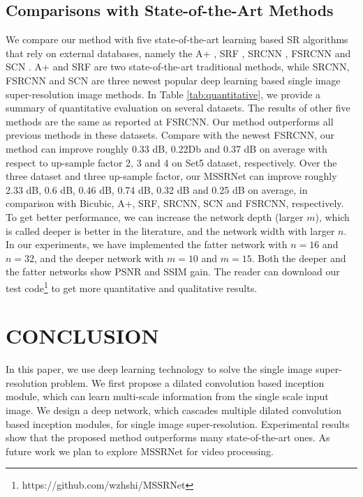 \documentclass{article}
\begin{document}
\subsection{Comparisons with State-of-the-Art Methods}
\label{subsec:comparisons}

We compare our method with five state-of-the-art learning based SR algorithms that rely on external databases, namely the A+ \cite{ref22}, SRF \cite{ref23}, SRCNN \cite{ref4,ref5}, FSRCNN \cite{ref7} and SCN \cite{ref24}. A+ and SRF are two state-of-the-art traditional methods, while SRCNN, FSRCNN and SCN are three newest popular deep learning based single image super-resolution image methods. In Table \ref{tab:quantitative}, we provide a summary of quantitative evaluation on several datasets. The results of other five methods are the same as reported at FSRCNN. Our method outperforms all previous methods in these datasets. Compare with the newest FSRCNN, our method can improve roughly 0.33 dB, 0.22Db and 0.37 dB on average with respect to up-sample factor 2, 3 and 4 on Set5 dataset, respectively. Over the three dataset and three up-sample factor, our MSSRNet can improve roughly 2.33 dB, 0.6 dB, 0.46 dB, 0.74 dB, 0.32 dB and 0.25 dB on average, in comparison with Bicubic, A+, SRF, SRCNN, SCN and FSRCNN, respectively. To get better performance, we can increase the network depth (larger $m$), which is called deeper is better in the literature, and the network width with larger $n$. In our experiments, we have implemented the fatter network with $n = 16$ and $n = 32$, and the deeper network with $m = 10$ and $m = 15$. Both the deeper and the fatter networks show PSNR and SSIM gain. The reader can download our test code\footnote{https://github.com/wzhshi/MSSRNet}  to get more quantitative and qualitative results.

\section{CONCLUSION}
\label{sec:conclution}

In this paper, we use deep learning technology to solve the single image super-resolution problem. We first propose a dilated convolution based inception module, which can learn multi-scale information from the single scale input image. We design a deep network, which cascades multiple dilated convolution based inception modules, for single image super-resolution. Experimental results show that the proposed method outperforms many state-of-the-art ones. As future work we plan to explore MSSRNet for video processing.
\end{document}

